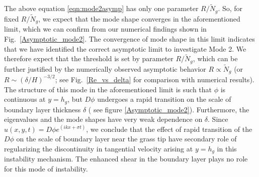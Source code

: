 \documentclass[12pt]{report}   %
\newcommand{\hg}{h_g}
\newcommand{\Rey}{{R}}
\newcommand{\Ndg}{\tilde{N}_g}
\begin{document}
The above equation \eqref{eqn:mode2asymp} has only one parameter $\Rey/\Ndg$. 
So, for fixed $\Rey/\Ndg$, we expect that the mode shape converges in the aforementioned limit, which we can confirm from our numerical findings shown in Fig.~\ref{Asymptotic_mode2}. The convergence of mode shape in this limit indicates that we have identified the correct asymptotic limit to investigate Mode 2. We therefore expect that the  threshold is set by parameter $\Rey/\Ndg$, which can be further justified by the numerically observed asymptotic behavior $\Rey \propto \Ndg$ (or $\Rey \sim ({\delta}/{H})^{-3/2}$; see Fig.~\ref{Re_vs_delta} for comparison with numerical results).
The structure of this mode in the aforementioned limit is such that $\phi$ is continuous at $y=h_g$, but $D\phi$ undergoes a rapid transition on the scale of boundary layer thickness $\delta$ ( see figure \ref{Asymptotic_mode2}).
Furthermore, the eigenvalues and the mode shapes have very weak dependence on $\delta$. Since $u(x,y,t) =  D\phi e^{(ikx+\sigma t)}$, we conclude that the effect of rapid transition of the $D\phi$ on the scale of boundary layer near the grass tip have secondary role of regularizing the discontinuity in tangential velocity arising at $y=\hg$ in this instability mechanism.
The enhanced shear in the boundary layer plays no role for this mode of instability.
\end{document}
